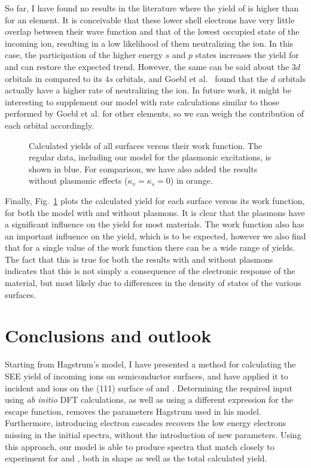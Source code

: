 \begin{refsection}
So far, I have found no results in the literature where the yield of  
is higher than  for an element. It is conceivable that these lower 
shell electrons have very little overlap between their wave function and that of 
the lowest occupied state of the incoming ion, resulting in a low likelihood 
of them neutralizing the ion. In this case, the participation of the higher 
energy $s$ and $p$ states increases the yield for  and can restore 
the expected trend. However, the same can be said 
about the $3d$ orbitals in  compared to its $4s$ orbitals, and Goebl 
et al.~\cite{Goebl2011} found that the $d$ orbitals actually have a higher 
rate of neutralizing the ion. In future work, it might be interesting to supplement our model 
with rate calculations similar to those performed by Goebl et al. for other 
elements, so we can weigh the contribution of each orbital accordingly. 

{
\begin{figure}[ht] 
\centering 
 
\caption{Calculated yields of all surfaces versus their work function. The 
regular data, including our model for the plasmonic excitations, is shown in 
blue. For comparison, we have also added the results without plasmonic effects 
($\kappa_v = \kappa_s = 0$) in orange.} 
\label{quotas:fig-versus_workfun} 
\end{figure}
}
 
Finally, Fig.~\ref{quotas:fig-versus_workfun} plots the calculated yield for 
each surface versus its work function, for both the model with and without 
plasmons. It is clear that the plasmons have a significant influence on the 
yield for most materials. The work function also has an important influence on 
the yield, which is to be expected, however we also find that for a single 
value of the work function there can be a wide range of yields. The fact that 
this is true for both the results with and without plasmons indicates that 
this is not simply a consequence of the electronic response of the material, 
but most likely due to differences in the density of states of the various 
surfaces. 
 
\section{Conclusions and outlook} 

Starting from Hagstrum's model, I have presented a method for calculating the 
SEE yield of incoming ions on semiconductor surfaces, and have applied it to 
incident  and  ions on the (111) surface of  and 
. Determining the required input using \textit{ab initio} DFT 
calculations, as well as using a different expression for the escape function, 
removes the parameters Hagstrum used in his model. Furthermore, introducing 
electron cascades recovers the low energy electrons missing in the initial spectra,
without the introduction of new parameters. Using this approach, our model is 
able to produce spectra that match closely to experiment for  and 
, both in shape as well as the total calculated yield.


\end{refsection}
